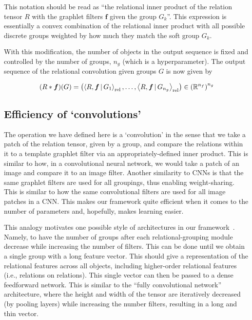 This notation should be read as ``the relational inner product of the relation tensor $R$ with the graphlet filters $\boldsymbol{f}$ given the group $G_k$''. This expression is essentially a convex combination of the relational inner product with all possible discrete groups weighted by how much they match the soft group $G_k$.

With this modification, the number of objects in the output sequence is fixed and controlled by the number of groups, $n_g$ (which is a hyperparameter). The output sequence of the relational convolution given groups $G$ is now given by

\begin{equation}
    \label{eq:soft_relational_convolution_groups}
    (R \ast \bm{f})(G) = \left( \left\langle R, \bm{f} \, \vert \, G_1 \right\rangle_\mathrm{rel}, \ldots, \left\langle R, \bm{f} \, \vert \, G_{n_g} \right\rangle_\mathrm{rel} \right) \in \left(\mathbb{R}^{n_f}\right)^{n_g}
\end{equation}


\subsection{Efficiency of `convolutions'}
The operation we have defined here is a `convolution' in the sense that we take a patch of the relation tensor, given by a group, and compare the relations within it to a template graphlet filter via an appropriately-defined inner product. This is similar to how, in a convolutional neural network, we would take a patch of an image and compare it to an image filter. Another similarity to CNNs is that the same graphlet filters are used for all groupings, thus enabling weight-sharing. This is similar to how the same convolutional filters are used for all image patches in a CNN. This makes our framework quite efficient when it comes to the number of parameters and, hopefully, makes learning easier.


This analogy motivates one possible style of architectures in our framework~. Namely, to have the number of groups after each relational-grouping module decrease while increasing the number of filters. This can be done until we obtain a single group with a long feature vector. This should give a representation of the relational features across all objects, including higher-order relational features (i.e., relations on relations). This single vector can then be passed to a dense feedforward network. This is similar to the ``fully convolutional network'' architecture, where the height and width of the tensor are iteratively decreased (by pooling layers) while increasing the number filters, resulting in a long and thin vector.

